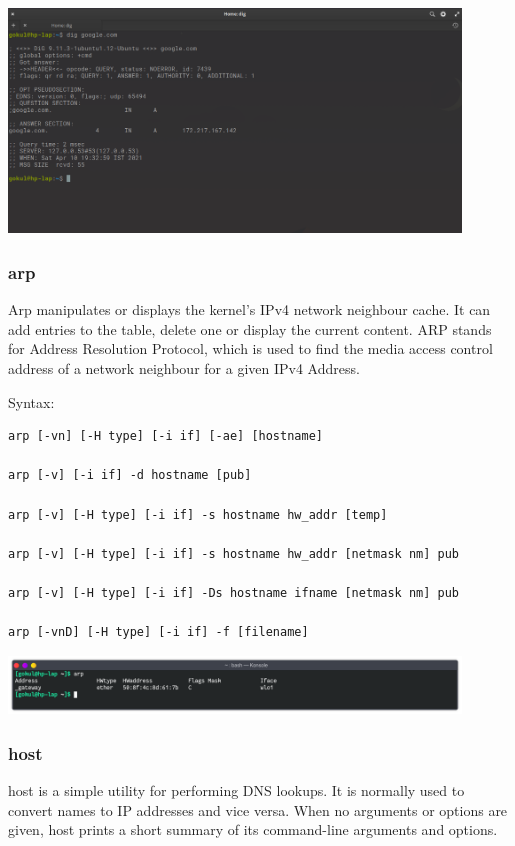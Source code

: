 \begin{center}
	\includegraphics[width=0.90\textwidth]{img/p1/ss7.png}
\end{center}


\subsubsection{arp}
Arp manipulates or displays the kernel's IPv4 network neighbour cache. It can add entries to the table, delete one or
display the current content.
ARP stands for Address Resolution Protocol, which is used to find the media access control address of a network neighbour
for a given IPv4 Address.
\linebreak[2]

Syntax:
\begin{lstlisting}
arp [-vn] [-H type] [-i if] [-ae] [hostname]

arp [-v] [-i if] -d hostname [pub]
 
arp [-v] [-H type] [-i if] -s hostname hw_addr [temp]
 
arp [-v] [-H type] [-i if] -s hostname hw_addr [netmask nm] pub
 
arp [-v] [-H type] [-i if] -Ds hostname ifname [netmask nm] pub
 
arp [-vnD] [-H type] [-i if] -f [filename] 
\end{lstlisting}

\begin{center}
	\includegraphics[width=0.90\textwidth]{img/p1/ss8.png}
\end{center}


\subsubsection{host}
host is a simple utility for performing DNS lookups. It is normally used to convert names to IP addresses and vice versa.
When no arguments or options are given, host prints a short summary of its command-line arguments and options.

